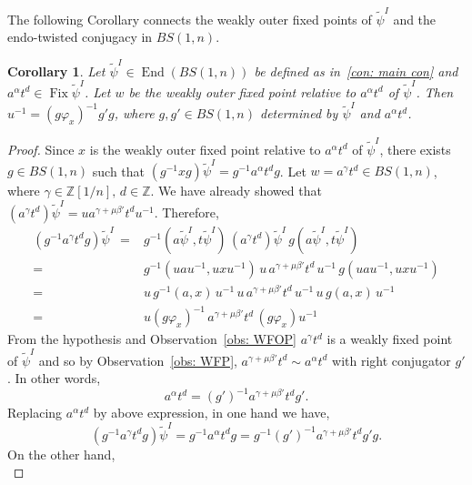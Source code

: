 \documentclass[a4paper]{amsart}
\newtheorem{cor}[thm]{Corollary}
\theoremstyle{definition}
\newcommand\ZZ{\mathbb{Z}}
\newcommand{\End}{\operatorname{End}}
\newcommand{\Fix}{\operatorname{Fix}}
\begin{document}
The following Corollary connects the weakly outer fixed points of $\widetilde{\psi}^{I}$ and the endo-twisted conjugacy in $BS(1,n)$.

\begin{cor}
    Let $\widetilde{\psi}^I \in \End(BS(1,n))$ be defined as in~\ref{con: main con} and $a^\alpha t^d \in \Fix\widetilde{\psi}^I$. Let $w$ be the weakly outer fixed point relative to $a^\alpha t^d$ of $\widetilde{\psi}^I$. Then $u^{-1} = (g\varphi_x)^{-1} g' g$, where $g, g' \in BS(1,n)$  determined by $\widetilde{\psi}^I$ and $a^\alpha t^d$.
\end{cor}


\begin{proof}
    Since $x$ is the weakly outer fixed point relative to $a^\alpha t^d$ of $\widetilde{\psi}^I$, there exists $g \in BS(1,n)$ such that $(g^{-1} x g)\widetilde{\psi}^I = g^{-1} a^\alpha t^d g$. Let $w = a^{\gamma}t^d \in BS(1,n)$, where $\gamma \in \ZZ[1/n], \, d \in \ZZ$. We have already showed that $(a^{\gamma}t^d)\widetilde{\psi}^I = u a^{\gamma + \mu \beta'} t^d u^{-1}$. Therefore,
    $$
\begin{array}{rl}
   (g^{-1} a^{\gamma}t^d g)\widetilde{\psi}^I \, = & g^{-1}(a\widetilde{\psi}^I, t\widetilde{\psi}^I) \, (a^{\gamma}t^d)\widetilde{\psi}^I \,  g(a\widetilde{\psi}^I, t\widetilde{\psi}^I) \\
    = & g^{-1}(uau^{-1}, uxu^{-1}) \,  u \, a^{\gamma + \mu \beta'} t^d \, u^{-1} \,  g(uau^{-1}, uxu^{-1})\\
    = & u \, g^{-1}(a,x) \, u^{-1} \, u\, a^{\gamma + \mu \beta'} t^d \, u^{-1} \, u\, g(a, x)\, u^{-1}\\
    = & u (g\varphi_x)^{-1} \, a^{\gamma + \mu \beta'} t^d \, (g\varphi_x) u^{-1}
\end{array}
$$
From the hypothesis and Observation~\ref{obs: WFOP} $a^{\gamma}t^d$ is a weakly fixed point of $\widetilde{\psi}^I$ and so by Observation~\ref{obs: WFP}, $a^{\gamma+\mu\beta'}t^d \sim a^{\alpha}t^d$ with right conjugator $g'$. In other words,
%
\begin{equation*}
    a^{\alpha}t^d = (g')^{-1} a^{\gamma+\mu\beta'}t^d g'.
\end{equation*}
%
Replacing $a^{\alpha}t^d$ by above expression, in one hand we have, 
%
\begin{equation}\label{eq: WFOP 1}
    (g^{-1} a^{\gamma}t^d g)\widetilde{\psi}^I = g^{-1} a^\alpha t^d g = g^{-1}(g')^{-1} a^{\gamma+\mu\beta'}t^d g'g.
\end{equation}
%
On the other hand,
%
\begin{equation}\label{eq: WFOP 2}

\end{equation}
\end{proof}
\end{document}
